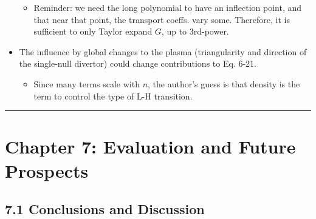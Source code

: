 \documentclass[a4paper]{article}
\begin{document}
\begin{itemize}
  \begin{itemize}
  \itemsep1pt\parskip0pt
  \item
    Reminder: we need the long polynomial to have an inflection point,
    and that near that point, the transport coeffs. vary some.
    Therefore, it is sufficient to only Taylor expand $G$, up to
    3rd-power.
  \end{itemize}
\item
  The influence by global changes to the plasma (triangularity and
  direction of the single-null divertor) could change contributions to
  Eq. 6-21.

  \begin{itemize}
  \itemsep1pt\parskip0pt
  \item
    Since many terms scale with $n$, the author's guess is that density
    is the term to control the type of L-H transition.
  \end{itemize}
\end{itemize}

\begin{center}\rule{3in}{0.4pt}\end{center}

\section{Chapter 7: Evaluation and Future
Prospects}\label{chapter-7-evaluation-and-future-prospects}

\subsection{7.1 Conclusions and
Discussion}\label{conclusions-and-discussion}
\end{document}

